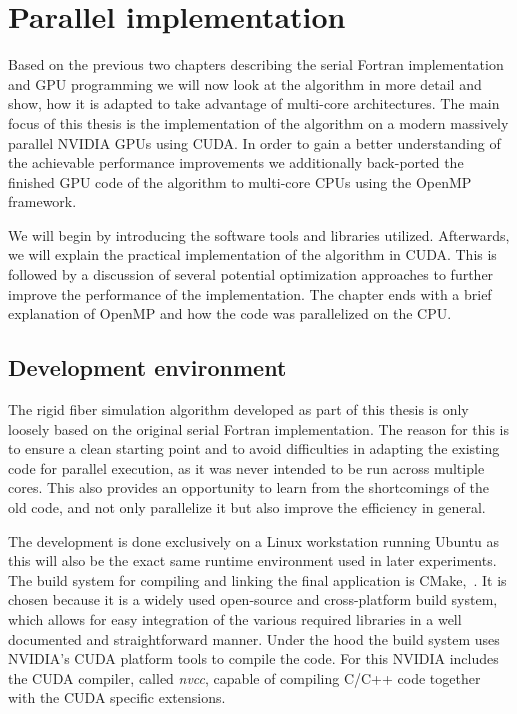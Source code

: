 \chapter{Parallel implementation}
\label{cha:parallel_implementation}

Based on the previous two chapters describing the serial Fortran implementation and GPU programming we will now look at the algorithm in more detail and show, how it is adapted to take advantage of multi-core architectures. The main focus of this thesis is the implementation of the algorithm on a modern massively parallel NVIDIA GPUs using CUDA. In order to gain a better understanding of the achievable performance improvements we additionally back-ported the finished GPU code of the algorithm to multi-core CPUs using the OpenMP framework.

We will begin by introducing the software tools and libraries utilized. Afterwards, we will explain the practical implementation of the algorithm in CUDA. This is followed by a discussion of several potential optimization approaches to further improve the performance of the implementation. The chapter ends with a brief explanation of OpenMP and how the code was parallelized on the CPU.

\section{Development environment}
The rigid fiber simulation algorithm developed as part of this thesis is only loosely based on the original serial Fortran implementation. The reason for this is to ensure a clean starting point and to avoid difficulties in adapting the existing code for parallel execution, as it was never intended to be run across multiple cores. This also provides an opportunity to learn from the shortcomings of the old code, and not only parallelize it but also improve the efficiency in general.

The development is done exclusively on a Linux workstation running Ubuntu as this will also be the exact same runtime environment used in later experiments. The build system for compiling and linking the final application is CMake,~\cite{CMake}. It is chosen because it is a widely used open-source and cross-platform build system, which allows for easy integration of the various required libraries in a well documented and straightforward manner. Under the hood the build system uses NVIDIA's CUDA platform tools to compile the code. For this NVIDIA includes the CUDA compiler, called \emph{nvcc}, capable of compiling C/C++ code together with the CUDA specific extensions.

